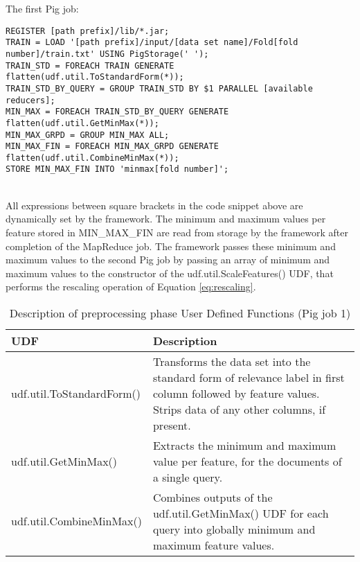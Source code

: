 The first Pig job:\\
\begin{minipage}{\linewidth}
\begin{lstlisting}
REGISTER [path prefix]/lib/*.jar;
TRAIN = LOAD '[path prefix]/input/[data set name]/Fold[fold number]/train.txt' USING PigStorage(' ');
TRAIN_STD = FOREACH TRAIN GENERATE flatten(udf.util.ToStandardForm(*));
TRAIN_STD_BY_QUERY = GROUP TRAIN_STD BY $1 PARALLEL [available reducers];
MIN_MAX = FOREACH TRAIN_STD_BY_QUERY GENERATE flatten(udf.util.GetMinMax(*));
MIN_MAX_GRPD = GROUP MIN_MAX ALL;
MIN_MAX_FIN = FOREACH MIN_MAX_GRPD GENERATE flatten(udf.util.CombineMinMax(*));
STORE MIN_MAX_FIN INTO 'minmax[fold number]';
\end{lstlisting}
\end{minipage}\\
All expressions between square brackets in the code snippet above are dynamically set by the framework. The minimum and maximum values per feature stored in MIN\_MAX\_FIN are read from storage by the framework after completion of the MapReduce job. The framework passes these minimum and maximum values to the second Pig job by passing an array of minimum and maximum values to the constructor of the udf.util.ScaleFeatures() \ac{UDF}, that performs the rescaling operation of Equation \ref{eq:rescaling}.\\

\begin{table}
\centering
\begin{tabular}{p{6cm}p{7cm}}\toprule
UDF & Description \\
\midrule
udf.util.ToStandardForm() & Transforms the data set into the standard form of relevance label in first column followed by feature values. Strips data of any other columns, if present.\\
udf.util.GetMinMax() & Extracts the minimum and maximum value per feature, for the documents of a single query.\\
udf.util.CombineMinMax() & Combines outputs of the udf.util.GetMinMax() UDF for each query into globally minimum and maximum feature values.\\
\bottomrule
\end{tabular}
\caption{Description of preprocessing phase User Defined Functions (Pig job 1)}
\label{tbl:preprocessing_udfs_1}
\end{table}

